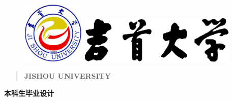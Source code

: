 \documentclass[12pt]{ctexart}
\begin{document}

\begin{figure}[t]
	\parbox[b]{2cm}{
		\includegraphics[width=3cm]{figures/JSU1958.jpg}
	}
	\parbox[b]{9cm}{
		\hspace{5cm}
		\includegraphics[height=2.3cm]{figures/JSU.jpg}
		\vskip 0.4cm
	}
\end{figure}

\parbox[b]{16cm}{   
	\begin{quotation}
		\hspace{3.4cm}
		 \textbf{\LARGE JISHOU UNIVERSITY}
	\end{quotation}
}


\begin{center}
	
\vspace{0.6cm} 
		
\fontsize{47pt}{1.7cm} \bfseries 本\hspace{0.24cm}科\hspace{0.24cm}生\hspace{0.24cm}毕\hspace{0.24cm}业\hspace{0.24cm}设\hspace{0.24cm}计

\end{center}
\vspace{1.8cm}
\end{document}
